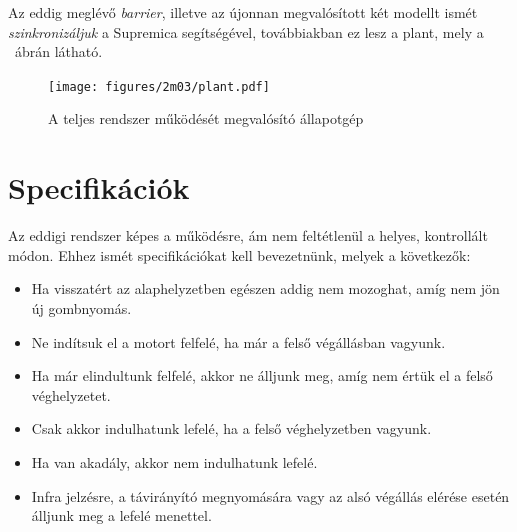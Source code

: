 Az eddig meglévő \textit{barrier}, illetve az újonnan megvalósított két modellt ismét \textit{szinkronizáljuk} a Supremica segítségével, továbbiakban ez lesz a plant, mely a ~ábrán látható.

\begin{figure}
	\centering
	\texttt{[image: figures/2m03/plant.pdf]}
	\caption{A teljes rendszer működését megvalósító állapotgép}
	\label{fig:Plant}
\end{figure}

\newpage
\section{Specifikációk}
Az eddigi rendszer képes a működésre, ám nem feltétlenül a helyes, kontrollált módon. Ehhez ismét specifikációkat kell bevezetnünk, melyek a következők:
\begin{itemize}
	\item Ha visszatért az alaphelyzetben egészen addig nem mozoghat, amíg nem jön új gombnyomás.
	\item Ne indítsuk el a motort felfelé, ha már a felső végállásban vagyunk.
	\item Ha már elindultunk felfelé, akkor ne álljunk meg, amíg nem értük el a felső véghelyzetet.
	\item Csak akkor indulhatunk lefelé, ha a felső véghelyzetben vagyunk.
	\item Ha van akadály, akkor nem indulhatunk lefelé.
	\item Infra jelzésre, a távirányító megnyomására vagy az alsó végállás elérése esetén álljunk meg a lefelé menettel.
\end{itemize}

